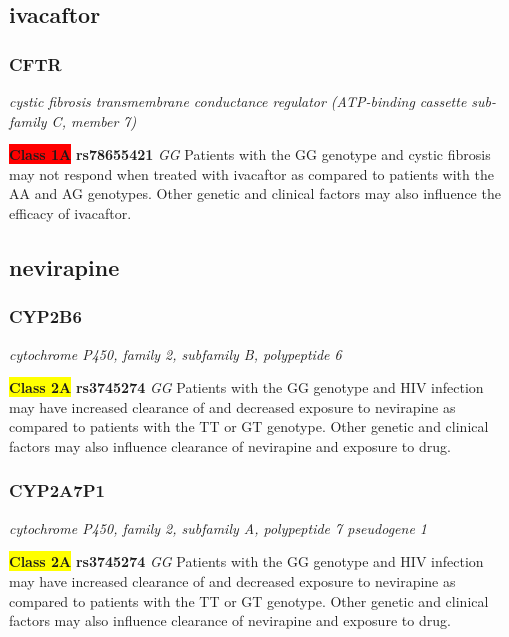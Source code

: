 \documentclass{report}
\begin{document}
\subsection{ ivacaftor }\subsubsection{ CFTR }
\textit{ cystic fibrosis transmembrane conductance regulator (ATP-binding cassette sub-family C, member 7) } \newline


\textbf{\colorbox{red} {Class 1A}} \textbf{ rs78655421 } \textit{ GG }
Patients with the GG genotype and cystic fibrosis may not respond when treated with ivacaftor as compared to patients with the AA and AG genotypes. Other genetic and clinical factors may also influence the efficacy of ivacaftor.\newline





\subsection{ nevirapine }\subsubsection{ CYP2B6 }
\textit{ cytochrome P450, family 2, subfamily B, polypeptide 6 } \newline




\textbf{\colorbox{yellow} {Class 2A}} \textbf{ rs3745274 } \textit{ GG }
Patients with the GG genotype and HIV infection may have increased clearance of and decreased exposure to nevirapine as compared to patients with the TT or GT genotype. Other genetic and clinical factors may also influence clearance of nevirapine and exposure to drug.\newline

\subsubsection{ CYP2A7P1 }
\textit{ cytochrome P450, family 2, subfamily A, polypeptide 7 pseudogene 1 } \newline




\textbf{\colorbox{yellow} {Class 2A}} \textbf{ rs3745274 } \textit{ GG }
Patients with the GG genotype and HIV infection may have increased clearance of and decreased exposure to nevirapine as compared to patients with the TT or GT genotype. Other genetic and clinical factors may also influence clearance of nevirapine and exposure to drug.\newline
\end{document}
